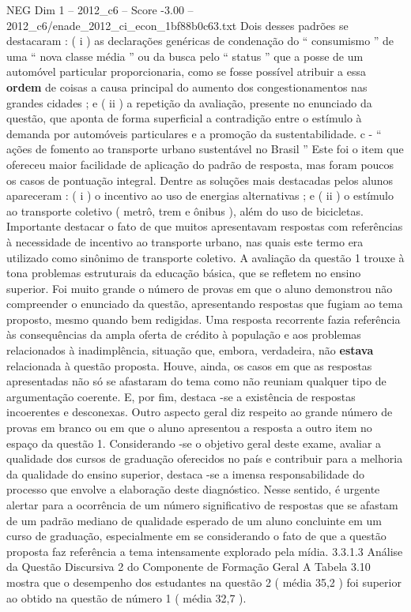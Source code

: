 \begin{textsample}{NEG Dim 1 – 2012\_c6 – Score -3.00 – 2012\_c6/enade\_2012\_ci\_econ\_1bf88b0c63.txt}
Dois desses padrões se destacaram : ( i ) as declarações genéricas de condenação do “ consumismo ” de uma “ nova classe média ” ou da busca pelo “ status ” que a posse de um automóvel particular proporcionaria, como se fosse possível atribuir a essa \textbf{ordem} de coisas a causa principal do aumento dos congestionamentos nas grandes cidades ; e ( ii ) a repetição da avaliação, presente no enunciado da questão, que aponta de forma superficial a contradição entre o estímulo à demanda por automóveis particulares e a promoção da sustentabilidade. c - “ ações de fomento ao transporte urbano sustentável no Brasil ” Este foi o item que ofereceu maior facilidade de aplicação do padrão de resposta, mas foram poucos os casos de pontuação integral.
Dentre as soluções mais destacadas pelos alunos apareceram : ( i ) o incentivo ao uso de energias alternativas ; e ( ii ) o estímulo ao transporte coletivo ( metrô, trem e ônibus ), além do uso de bicicletas.
Importante destacar o fato de que muitos apresentavam respostas com referências à necessidade de incentivo ao transporte urbano, nas quais este termo era utilizado como sinônimo de transporte coletivo.
A avaliação da questão 1 trouxe à tona problemas estruturais da educação básica, que se refletem no ensino superior.
Foi muito grande o número de provas em que o aluno demonstrou não compreender o enunciado da questão, apresentando respostas que fugiam ao tema proposto, mesmo quando bem redigidas.
Uma resposta recorrente fazia referência às consequências da ampla oferta de crédito à população e aos problemas relacionados à inadimplência, situação que, embora, verdadeira, não \textbf{estava} relacionada à questão proposta.
Houve, ainda, os casos em que as respostas apresentadas não só se afastaram do tema como não reuniam qualquer tipo de argumentação coerente.
E, por fim, destaca -se a existência de respostas incoerentes e desconexas.
Outro aspecto geral diz respeito ao grande número de provas em branco ou em que o aluno apresentou a resposta a outro item no espaço da questão 1.
Considerando -se o objetivo geral deste exame, avaliar a qualidade dos cursos de graduação oferecidos no país e contribuir para a melhoria da qualidade do ensino superior, destaca -se a imensa responsabilidade do processo que envolve a elaboração deste diagnóstico.
Nesse sentido, é urgente alertar para a ocorrência de um número significativo de respostas que se afastam de um padrão mediano de qualidade esperado de um aluno concluinte em um curso de graduação, especialmente em se considerando o fato de que a questão proposta faz referência a tema intensamente explorado pela mídia. 3.3.1.3 Análise da Questão Discursiva 2 do Componente de Formação Geral A Tabela 3.10 mostra que o desempenho dos estudantes na questão 2 ( média 35,2 ) foi superior ao obtido na questão de número 1 ( média 32,7 ).

\end{textsample}
